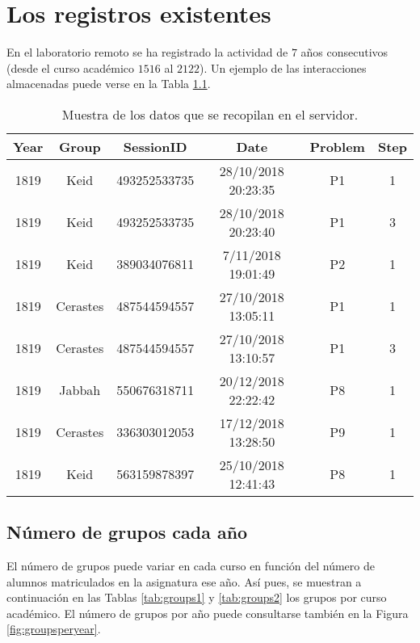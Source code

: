 \chapter{Los registros existentes}\label{sec:chapterVI}

En el laboratorio remoto se ha registrado la actividad de $7$ años consecutivos (desde el curso académico $1516$ al $2122$). Un ejemplo de las interacciones almacenadas puede verse en la Tabla \ref{tab:example}.

\begin{table}[H]
\centering
\caption{Muestra de los datos que se recopilan en el servidor.}
\label{tab:example}
\begin{tabular}{cccccc}
\hline
\textbf{Year} & \textbf{Group} & \textbf{SessionID} & \textbf{Date}       & \textbf{Problem} & \textbf{Step} \\ \hline
1819          & Keid           & 493252533735       & 28/10/2018 20:23:35 & P1               & 1             \\ 
1819          & Keid           & 493252533735       & 28/10/2018 20:23:40 & P1               & 3             \\ 
1819          & Keid           & 389034076811       & 7/11/2018 19:01:49  & P2               & 1             \\
1819          & Cerastes       & 487544594557       & 27/10/2018 13:05:11 & P1               & 1             \\
1819          & Cerastes       & 487544594557       & 27/10/2018 13:10:57 & P1               & 3             \\
1819          & Jabbah         & 550676318711       & 20/12/2018 22:22:42 & P8               & 1             \\
1819          & Cerastes       & 336303012053       & 17/12/2018 13:28:50 & P9               & 1             \\ 
1819          & Keid           & 563159878397       & 25/10/2018 12:41:43 & P8               & 1             \\ \hline
\end{tabular}
\end{table}

\section{Número de grupos cada año}

El número de grupos puede variar en cada curso en función del número de alumnos matriculados en la asignatura ese año. Así pues, se muestran a continuación en las Tablas \ref{tab:groups1} y \ref{tab:groups2} los grupos por curso académico. El número de grupos por año puede consultarse también en la Figura \ref{fig:groupsperyear}.

